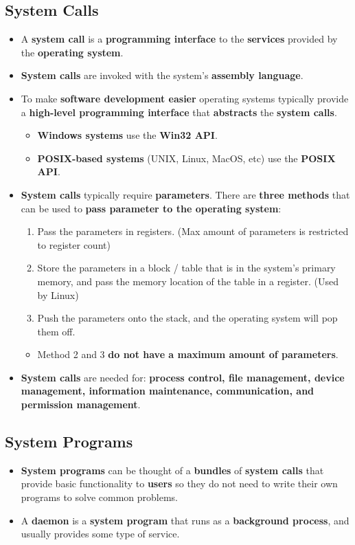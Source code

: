 \documentclass[16pt]{article}
\begin{document}
    \subsection*{System Calls}
    \begin{itemize}
        \item A \textbf{system call} is a \textbf{programming interface} to the \textbf{services} provided by the \textbf{operating system}.
        \item \textbf{System calls} are invoked with the system's \textbf{assembly language}.
        \item To make \textbf{software development easier} operating systems typically provide a \textbf{high-level programming interface} that \textbf{abstracts} the \textbf{system calls}.
        \begin{itemize}
            \item \textbf{Windows systems} use the \textbf{Win32 API}.
            \item \textbf{POSIX-based systems} (UNIX, Linux, MacOS, etc) use the \textbf{POSIX API}.
        \end{itemize}
        \item \textbf{System calls} typically require \textbf{parameters}. There are \textbf{three methods} that can be used to \textbf{pass parameter to the operating system}:
        \begin{enumerate}
            \item Pass the parameters in registers. (Max amount of parameters is restricted to register count)
            \item Store the parameters in a block / table that is in the system's primary memory, and pass the memory location of the table in a register. (Used by Linux)
            \item Push the parameters onto the stack, and the operating system will pop them off.
        \end{enumerate}
        \begin{itemize}
            \item Method 2 and 3 \textbf{do not have a maximum amount of parameters}.
        \end{itemize}
        \item \textbf{System calls} are needed for: \textbf{process control, file management, device management, information maintenance, communication, and permission management}.
    \end{itemize}

    \subsection*{System Programs}
    \begin{itemize}
        \item \textbf{System programs} can be thought of a \textbf{bundles} of \textbf{system calls} that provide basic functionality to \textbf{users} so they do not need to write their own programs to solve common problems.
        \item A \textbf{daemon} is a \textbf{system program} that runs as a \textbf{background process}, and usually provides some type of service.
    \end{itemize}
\end{document}
